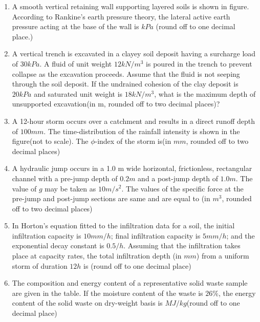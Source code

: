 \documentclass[journal]{IEEEtran}
\begin{document}
\begin{enumerate}
	\item
	A smooth vertical retaining wall supporting layered soils is shown in figure. According to Rankine's earth pressure theory, the lateral active earth pressure acting at the base of the wall is $kPa$ (round off to one decimal place.)
	\begin{figure}[H]
    		\centering
    		
    		\caption{}
    		\label{36}
	\end{figure}
	\item
	A vertical trench is excavated in a clayey soil deposit having a surcharge load of $30 kPa$. A fluid of unit weight $12 kN/m^{3}$ is poured in the trench to prevent collapse as the excavation proceeds. Assume that the fluid is not seeping through the soil deposit. If the undrained cohesion of the clay deposit is $20 kPa$ and saturated unit weight is $18 kN/m^{3}$, what is the maximum depth of unsupported excavation(in m, rounded off to two decimal places)?
	\item
	A 12-hour storm occurs over a catchment and results in a direct runoff depth of $100 mm$. The time-distribution of the rainfall intensity is shown in the figure(not to scale). The $\phi$-index of the storm is(in $mm$, rounded off to two decimal places)
	\begin{figure}[H]
    		\centering
    		
    		\caption{}
    		\label{36}
	\end{figure}
	\item
	A hydraulic jump occurs in a 1.0 m wide horizontal, frictionless, rectangular channel with a pre-jump depth of $0.2 m$ and a post-jump depth of $1.0 m$. The value of $g$ may be taken as $10 m/s^2$. The values of the specific force at the pre-jump and post-jump sections are same and are equal to (in $m^3$, rounded off to two decimal places)
	\item
	In Horton's equation fitted to the infiltration data for a soil, the initial infiltration capacity is $10 mm/h$; final infiltration capacity is $5 mm/h$; and the exponential decay constant is $0.5 /h$. Assuming that the infiltration takes place at capacity rates, the total infiltration depth (in $mm$) from a uniform storm of duration $12 h$ is (round off to one decimal place)
	\item
	The composition and energy content of a representative solid waste sample are given in the table. If the moisture content of the waste is $26 \%$, the energy content of the solid waste on dry-weight basis is $MJ/kg$(round off to one decimal place)

\end{enumerate}
\end{document}
